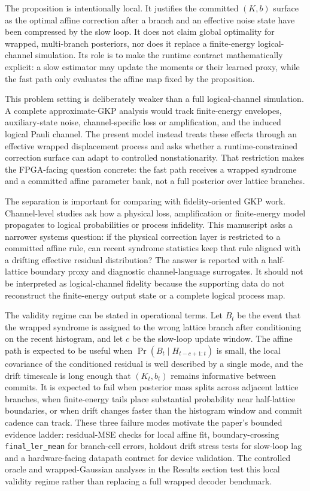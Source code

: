 \documentclass[11pt]{article}
\newcommand{\finalLER}{\texttt{final\_ler\_mean}}
\begin{document}
The proposition is intentionally local.  It justifies the committed
\((K,b)\) surface as the optimal affine correction after a branch and an
effective noise state have been compressed by the slow loop.  It does not
claim global optimality for wrapped, multi-branch posteriors, nor does it
replace a finite-energy logical-channel simulation.  Its role is to make the
runtime contract mathematically explicit: a slow estimator may update the
moments or their learned proxy, while the fast path only evaluates the affine
map fixed by the proposition.

This problem setting is deliberately weaker than a full logical-channel
simulation.  A complete approximate-GKP analysis would track finite-energy
envelopes, auxiliary-state noise, channel-specific loss or amplification, and
the induced logical Pauli channel.  The present model instead treats these
effects through an effective wrapped displacement process and asks whether a
runtime-constrained correction surface can adapt to controlled nonstationarity.
That restriction makes the FPGA-facing question concrete: the fast path
receives a wrapped syndrome and a committed affine parameter bank, not a full
posterior over lattice branches.

The separation is important for comparing with fidelity-oriented GKP work.
Channel-level studies ask how a physical loss, amplification or finite-energy
model propagates to logical probabilities or process infidelity.  This
manuscript asks a narrower systems question: if the physical correction layer is
restricted to a committed affine rule, can recent syndrome statistics keep that
rule aligned with a drifting effective residual distribution?  The answer is
reported with a half-lattice boundary proxy and diagnostic channel-language
surrogates.  It should not be interpreted as logical-channel fidelity because
the supporting data do not reconstruct the finite-energy output state or a
complete logical process map.

The validity regime can be stated in operational terms.  Let \(B_t\) be the
event that the wrapped syndrome is assigned to the wrong lattice branch after
conditioning on the recent histogram, and let \(c\) be the slow-loop update
window.  The affine path is expected to be useful when
\(\Pr(B_t\mid H_{t-c+1:t})\) is small, the local covariance of the conditioned
residual is well described by a single mode, and the drift timescale is long
enough that \((K_t,b_t)\) remains informative between commits.  It is expected
to fail when posterior mass splits across adjacent lattice branches, when
finite-energy tails place substantial probability near half-lattice
boundaries, or when drift changes faster than the histogram window and commit
cadence can track.  These three failure modes motivate the paper's bounded
evidence ladder: residual-MSE checks for local affine fit, boundary-crossing
\finalLER{} for branch-cell errors, holdout drift stress tests for slow-loop
lag and a hardware-facing datapath contract for device validation.  The
controlled oracle and wrapped-Gaussian analyses in the Results section test
this local validity regime rather than replacing a full wrapped decoder
benchmark.
\end{document}
